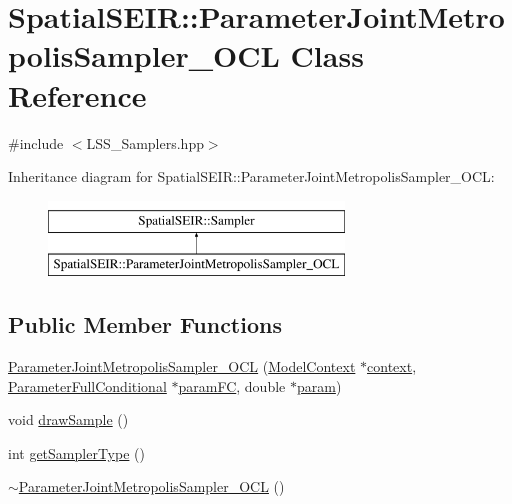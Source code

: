\hypertarget{classSpatialSEIR_1_1ParameterJointMetropolisSampler__OCL}{\section{Spatial\-S\-E\-I\-R\-:\-:Parameter\-Joint\-Metropolis\-Sampler\-\_\-\-O\-C\-L Class Reference}
\label{classSpatialSEIR_1_1ParameterJointMetropolisSampler__OCL}
}


{\ttfamily \#include $<$L\-S\-S\-\_\-\-Samplers.\-hpp$>$}

Inheritance diagram for Spatial\-S\-E\-I\-R\-:\-:Parameter\-Joint\-Metropolis\-Sampler\-\_\-\-O\-C\-L\-:\begin{figure}[H]
\begin{center}
\leavevmode
\includegraphics[height=2.000000cm]{classSpatialSEIR_1_1ParameterJointMetropolisSampler__OCL}
\end{center}
\end{figure}
\subsection*{Public Member Functions}
\begin{DoxyCompactItemize}
\item 
\hyperlink{classSpatialSEIR_1_1ParameterJointMetropolisSampler__OCL_a8b74295190dc338730bf3ed73375b100}{Parameter\-Joint\-Metropolis\-Sampler\-\_\-\-O\-C\-L} (\hyperlink{classSpatialSEIR_1_1ModelContext}{Model\-Context} $\ast$\hyperlink{classSpatialSEIR_1_1ParameterJointMetropolisSampler__OCL_acce9d454489373f0549af4f15dade51a}{context}, \hyperlink{classSpatialSEIR_1_1ParameterFullConditional}{Parameter\-Full\-Conditional} $\ast$\hyperlink{classSpatialSEIR_1_1ParameterJointMetropolisSampler__OCL_a143445da6bf7037f86020e04185f4472}{param\-F\-C}, double $\ast$\hyperlink{classSpatialSEIR_1_1ParameterJointMetropolisSampler__OCL_aa010e1643feb5965065efb65fd101a6f}{param})
\item 
void \hyperlink{classSpatialSEIR_1_1ParameterJointMetropolisSampler__OCL_a21b7e344e6145b14db9cce5212c74d18}{draw\-Sample} ()
\item 
int \hyperlink{classSpatialSEIR_1_1ParameterJointMetropolisSampler__OCL_a1049eea747bcdaa8112defcc52a651d5}{get\-Sampler\-Type} ()
\item 
\hyperlink{classSpatialSEIR_1_1ParameterJointMetropolisSampler__OCL_a0cf77cb7a998c175b2d9d3c2cc768c20}{$\sim$\-Parameter\-Joint\-Metropolis\-Sampler\-\_\-\-O\-C\-L} ()
\end{DoxyCompactItemize}
